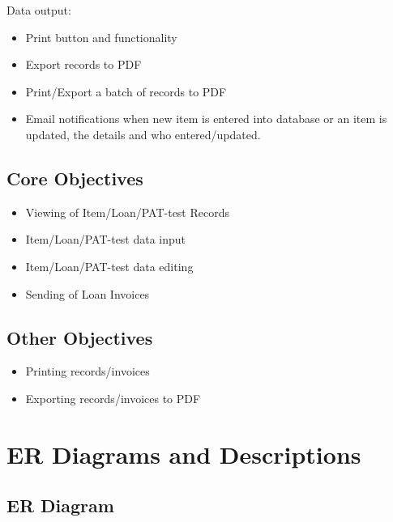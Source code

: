 \noindent Data output:
\begin{itemize}
    \item Print button and functionality
    \item Export records to PDF
    \item Print/Export a batch of records to PDF
    \item Email notifications when new item is entered into database or an item is updated, the details and who entered/updated.
\end{itemize}


\subsection{Core Objectives}

\begin{itemize}
    \item Viewing of Item/Loan/PAT-test Records
    \item Item/Loan/PAT-test data input
    \item Item/Loan/PAT-test data editing
    \item Sending of Loan Invoices
\end{itemize}

\subsection{Other Objectives}

\begin{itemize}
    \item Printing records/invoices
    \item Exporting records/invoices to PDF
\end{itemize}

\section{ER Diagrams and Descriptions}

\subsection{ER Diagram}

